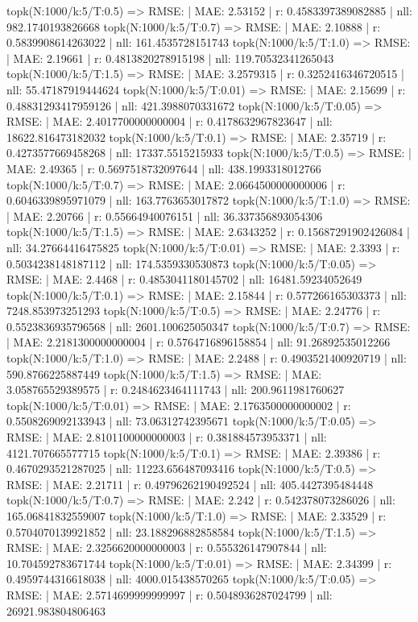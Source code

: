 topk(N:1000/k:5/T:0.5) => RMSE: | MAE: 2.53152 | r: 0.4583397389082885 | nll: 982.1740193826668
topk(N:1000/k:5/T:0.7) => RMSE: | MAE: 2.10888 | r: 0.5839908614263022 | nll: 161.4535728151743
topk(N:1000/k:5/T:1.0) => RMSE: | MAE: 2.19661 | r: 0.4813820278915198 | nll: 119.70532341265043
topk(N:1000/k:5/T:1.5) => RMSE: | MAE: 3.2579315 | r: 0.3252416346720515 | nll: 55.47187919444624
topk(N:1000/k:5/T:0.01) => RMSE: | MAE: 2.15699 | r: 0.48831293417959126 | nll: 421.3988070331672
topk(N:1000/k:5/T:0.05) => RMSE: | MAE: 2.4017700000000004 | r: 0.4178632967823647 | nll: 18622.816473182032
topk(N:1000/k:5/T:0.1) => RMSE: | MAE: 2.35719 | r: 0.4273577669458268 | nll: 17337.5515215933
topk(N:1000/k:5/T:0.5) => RMSE: | MAE: 2.49365 | r: 0.5697518732097644 | nll: 438.1993318012766
topk(N:1000/k:5/T:0.7) => RMSE: | MAE: 2.0664500000000006 | r: 0.6046339895971079 | nll: 163.7763653017872
topk(N:1000/k:5/T:1.0) => RMSE: | MAE: 2.20766 | r: 0.55664940076151 | nll: 36.337356893054306
topk(N:1000/k:5/T:1.5) => RMSE: | MAE: 2.6343252 | r: 0.15687291902426084 | nll: 34.27664416475825
topk(N:1000/k:5/T:0.01) => RMSE: | MAE: 2.3393 | r: 0.5034238148187112 | nll: 174.5359330530873
topk(N:1000/k:5/T:0.05) => RMSE: | MAE: 2.4468 | r: 0.4853041180145702 | nll: 16481.59234052649
topk(N:1000/k:5/T:0.1) => RMSE: | MAE: 2.15844 | r: 0.577266165303373 | nll: 7248.853973251293
topk(N:1000/k:5/T:0.5) => RMSE: | MAE: 2.24776 | r: 0.5523836935796568 | nll: 2601.100625050347
topk(N:1000/k:5/T:0.7) => RMSE: | MAE: 2.2181300000000004 | r: 0.5764716896158854 | nll: 91.26892535012266
topk(N:1000/k:5/T:1.0) => RMSE: | MAE: 2.2488 | r: 0.4903521400920719 | nll: 590.8766225887449
topk(N:1000/k:5/T:1.5) => RMSE: | MAE: 3.058765529389575 | r: 0.2484623464111743 | nll: 200.9611981760627
topk(N:1000/k:5/T:0.01) => RMSE: | MAE: 2.1763500000000002 | r: 0.5508269092133943 | nll: 73.06312742395671
topk(N:1000/k:5/T:0.05) => RMSE: | MAE: 2.8101100000000003 | r: 0.381884573953371 | nll: 4121.707665577715
topk(N:1000/k:5/T:0.1) => RMSE: | MAE: 2.39386 | r: 0.4670293521287025 | nll: 11223.656487093416
topk(N:1000/k:5/T:0.5) => RMSE: | MAE: 2.21711 | r: 0.49796262190492524 | nll: 405.4427395484448
topk(N:1000/k:5/T:0.7) => RMSE: | MAE: 2.242 | r: 0.542378073286026 | nll: 165.06841832559007
topk(N:1000/k:5/T:1.0) => RMSE: | MAE: 2.33529 | r: 0.5704070139921852 | nll: 23.188296882858584
topk(N:1000/k:5/T:1.5) => RMSE: | MAE: 2.3256620000000003 | r: 0.555326147907844 | nll: 10.704592783671744
topk(N:1000/k:5/T:0.01) => RMSE: | MAE: 2.34399 | r: 0.4959744316618038 | nll: 4000.015438570265
topk(N:1000/k:5/T:0.05) => RMSE: | MAE: 2.5714699999999997 | r: 0.5048936287024799 | nll: 26921.983804806463
